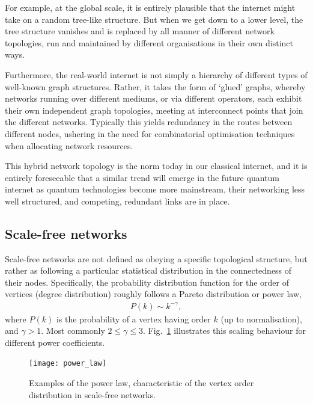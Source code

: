 For example, at the global scale, it is entirely plausible that the internet might take on a random tree-like structure. But when we get down to a lower level, the tree structure vanishes and is replaced by all manner of different network topologies, run and maintained by different organisations in their own distinct ways.

Furthermore, the real-world internet is not simply a hierarchy of different types of well-known graph structures. Rather, it takes the form of `glued' graphs, whereby networks running over different mediums, or via different operators, each exhibit their own independent graph topologies, meeting at interconnect points that join the different networks. Typically this yields redundancy in the routes between different nodes, ushering in the need for combinatorial optimisation techniques when allocating network resources.

This hybrid network topology is the norm today in our classical internet, and it is entirely foreseeable that a similar trend will emerge in the future quantum internet as quantum technologies become more mainstream, their networking less well structured, and competing, redundant links are in place.

%
%

\subsection{Scale-free networks}\label{sec:scale_free_networks}

Scale-free networks are not defined as obeying a specific topological structure, but rather as following a particular statistical distribution in the connectedness of their nodes. Specifically, the probability distribution function for the order of vertices (degree distribution) roughly follows a Pareto distribution or power law,
\begin{align}\label{eq:pareto_dist}
	P(k) \sim k^{-\gamma},
\end{align}
where $P(k)$ is the probability of a vertex having order $k$ (up to normalisation), and \mbox{$\gamma>1$}. Most commonly \mbox{$2\leq\gamma\leq 3$}. Fig.~\ref{fig:power_law} illustrates this scaling behaviour for different power coefficients.

\begin{figure}[!htbp]
\texttt{[image: power\_law]}
\captionspacefig \caption{Examples of the power law, characteristic of the vertex order distribution in scale-free networks.}\label{fig:power_law}	
\end{figure}

